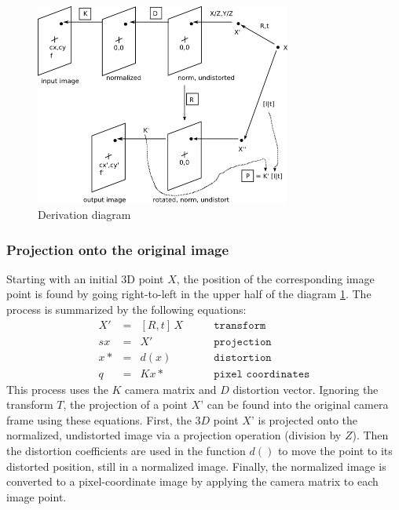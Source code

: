 \begin{figure}[!htbp]
 \centering
 \includegraphics[width=0.75\textwidth]{images/camera_model03.png}
 \caption{Derivation diagram}
 \label{fig:camera_model03}
\end{figure}

\subsubsection{Projection onto the original image}

Starting with an initial 3D point $X$, the position of the corresponding image point is found by going right-to-left in the upper half of the diagram \ref{fig:camera_model03}. The process is summarized by the following equations:
\[
\begin{array}{rcll}
X' &=& [R,t]\,X  & \quad \quad \texttt{transform} \\
sx &=& X'        & \quad \quad \texttt{projection} \\
x* &=& d(x)      & \quad \quad \texttt{distortion} \\
q  &=& Kx*       & \quad \quad \texttt{pixel coordinates}
\end{array}
\]
This process uses the $K$ camera matrix and $D$ distortion vector. Ignoring the transform $T$, the projection of a point $X$' can be found into the original camera frame using these equations. First, the $3D$ point $X$' is projected onto the normalized, undistorted image via a projection operation (division by $Z$). Then the distortion coefficients are used in the function $d()$ to move the point to its distorted position, still in a normalized image. Finally, the normalized image is converted to a pixel-coordinate image by applying the camera matrix to each image point.


